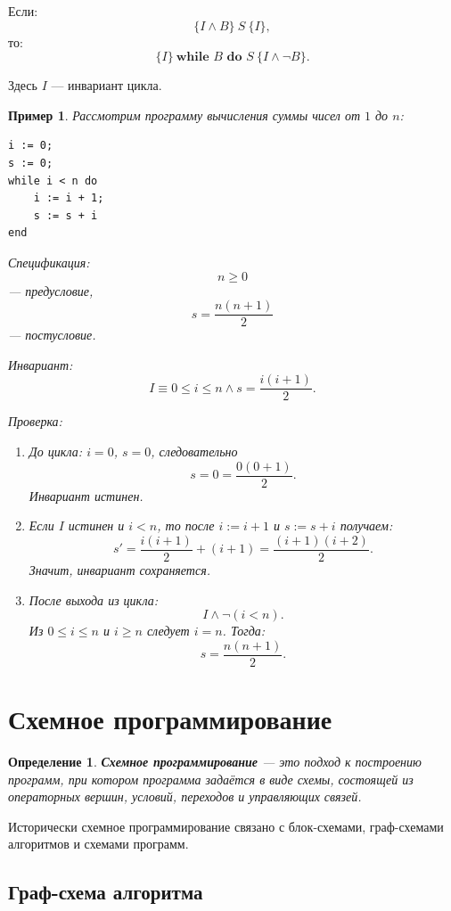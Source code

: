 \documentclass[12pt,a4paper]{article}
\newtheorem{definition}{Определение}
\newtheorem{example}{Пример}
\begin{document}
Если:
\[
    \{I \land B\}\ S\ \{I\},
\]
то:
\[
    \{I\}\ \textbf{while } B \textbf{ do } S\ \{I \land \neg B\}.
\]

Здесь $I$ --- инвариант цикла.

\begin{example}
Рассмотрим программу вычисления суммы чисел от $1$ до $n$:

\begin{lstlisting}[style=pseudo]
i := 0;
s := 0;
while i < n do
    i := i + 1;
    s := s + i
end
\end{lstlisting}

Спецификация:
\[
    n \geq 0
\]
--- предусловие,
\[
    s = \frac{n(n+1)}{2}
\]
--- постусловие.

Инвариант:
\[
    I \equiv 0 \leq i \leq n \land s = \frac{i(i+1)}{2}.
\]

Проверка:
\begin{enumerate}
    \item До цикла: $i=0$, $s=0$, следовательно
    \[
        s = 0 = \frac{0(0+1)}{2}.
    \]
    Инвариант истинен.

    \item Если $I$ истинен и $i<n$, то после $i := i+1$ и $s := s+i$ получаем:
    \[
        s' = \frac{i(i+1)}{2} + (i+1)
            = \frac{(i+1)(i+2)}{2}.
    \]
    Значит, инвариант сохраняется.

    \item После выхода из цикла:
    \[
        I \land \neg(i<n).
    \]
    Из $0 \leq i \leq n$ и $i \geq n$ следует $i=n$.
    Тогда:
    \[
        s = \frac{n(n+1)}{2}.
    \]
\end{enumerate}
\end{example}

\section{Схемное программирование}

\begin{definition}
\textbf{Схемное программирование} --- это подход к построению программ, при котором программа задаётся в виде схемы, состоящей из операторных вершин, условий, переходов и управляющих связей.
\end{definition}

Исторически схемное программирование связано с блок-схемами, граф-схемами алгоритмов и схемами программ.

\subsection{Граф-схема алгоритма}
\end{document}
